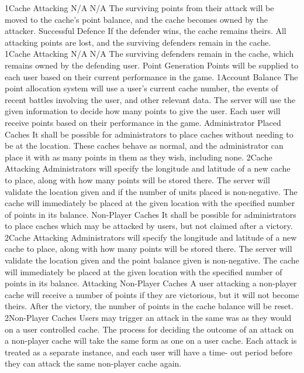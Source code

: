 			{1}{Cache Attacking}
			{N/A}
			{N/A}
			{The surviving points from their attack will be moved to the 
			cache's point balance, and the cache becomes owned by the attacker.
			}
		\funcreq
			{Successful Defence}
			{If the defender wins, the cache remains theirs. All attacking 
			points are lost, and the surviving defenders remain in the cache.}
			{1}{Cache Attacking}
			{N/A}
			{N/A}
			{The surviving defenders remain in the cache, which remains owned 
			by the defending user.}
		\funcreq
			{Point Generation}
			{Points will be supplied to each user based on their current 
			performance in the game.}
			{1}{Account Balance}
			{The point allocation system will use a user's current cache 
			number, the events of recent battles involving the user, and other 
			relevant data.}
			{The server will use the given information to decide how many points to give the user.}
			{Each user will receive points based on their performance in the 
			game.}
		\funcreq
			{Administrator Placed Caches}
			{It shall be possible for administrators to place caches without 
			needing to be at the location. These caches behave as normal, and the 
			administrator can place it with as many points in them as they wish, including none.}
			{2}{Cache Attacking}
			{Administrators will specify the longitude and latitude of a new 
			cache to place, along with how many points will be stored there.}
			{The server will validate the location given and if the number of 
			units placed is non-negative.}
			{The cache will immediately be placed at the given location with 
			the specified number of points in its balance.}
		\funcreq
			{Non-Player Caches}
			{It shall be possible for administrators to place caches which may 
			be attacked by users, but not claimed after a victory.}
			{2}{Cache Attacking}
			{Administrators will specify the longitude and latitude of a new 
			cache to place, along with how many points will be stored there.}
			{The server will validate the location given and the point balance 
			given is non-negative.}
			{The cache will immediately be placed at the given location with 
			the specified number of points in its balance.}
		\funcreq
			{Attacking Non-Player Caches}
			{A user attacking a non-player cache will receive a number of 
			points if they are victorious, but it will not become theirs. 
			After the victory, the number of points in the cache balance will 
			be reset.}
			{2}{Non-Player Caches}
			{Users may trigger an attack in the same was as they would on a 
			user controlled cache.}
			{The process for deciding the outcome of an attack on a non-player 
			cache will take the same form as one on a user cache. Each attack 
			is treated as a separate instance, and each user will have a time-
			out period before they can attack the same non-player cache again.}
